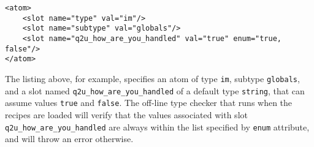 \lstset{language=XML}
\begin{lstlisting}
<atom>
    <slot name="type" val="im"/>
    <slot name="subtype" val="globals"/>
    <slot name="q2u_how_are_you_handled" val="true" enum="true, false"/>
</atom>
\end{lstlisting}

The listing above, for example, specifies an atom of type \texttt{im}, subtype \texttt{globals}, and a slot named \texttt{q2u\_how\_are\_you\_handled} of a default type \texttt{string}, that can assume values \texttt{true} and \texttt{false}. The off-line type checker that runs when the recipes are loaded will verify that the values associated with slot \texttt{q2u\_how\_are\_you\_handled} are always within the list specified by \texttt{enum} attribute, and will throw an error otherwise.